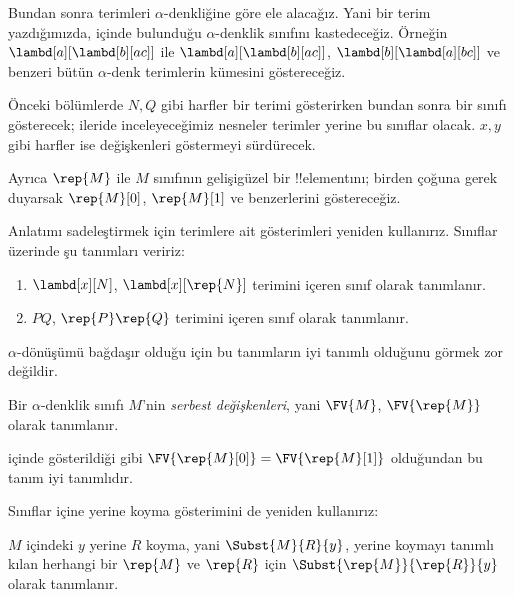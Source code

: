 


Bundan sonra terimleri $\alpha$-denkliğine göre ele alacağız. Yani bir terim
yazdığımızda, içinde bulunduğu $\alpha$-denklik sınıfını kastedeceğiz.
Örneğin $\lambd[a][\lambd[b][a c]]$ ile
$\lambd[a][\lambd[b][a c]]$, $\lambd[b][\lambd[a][b c]]$ ve benzeri bütün
$\alpha$-denk terimlerin kümesini göstereceğiz.

Önceki bölümlerde $N,Q$ gibi harfler bir terimi gösterirken bundan sonra bir
sınıfı gösterecek; ileride inceleyeceğimiz nesneler terimler yerine bu
sınıflar olacak. $x,y$ gibi harfler ise değişkenleri göstermeyi sürdürecek.

Ayrıca $\rep{M}$ ile $M$ sınıfının gelişigüzel bir !!{element}{}ını;
birden çoğuna gerek duyarsak $\rep{M}[0]$, $\rep{M}[1]$ ve benzerlerini
göstereceğiz.

Anlatımı sadeleştirmek için terimlere ait gösterimleri yeniden kullanırız.
Sınıflar üzerinde şu tanımları veririz:
\begin{defn}
  \begin{enumerate}
  \item $\lambd[x][N]$, $\lambd[x][\rep{N}]$ terimini içeren sınıf olarak
    tanımlanır.
  \item $PQ$, $\rep{P}\rep{Q}$ terimini içeren sınıf olarak tanımlanır.
  \end{enumerate}
\end{defn}

$\alpha$-dönüşümü bağdaşır olduğu için bu tanımların iyi tanımlı olduğunu
görmek zor değildir.

\begin{defn} 
  Bir $\alpha$-denklik sınıfı $M$'nin \emph{serbest değişkenleri}, yani
  $\FV{M}$, $\FV{\rep{M}}$ olarak tanımlanır.
\end{defn}

 içinde gösterildiği gibi
$\FV{\rep{M}[0]}=\FV{\rep{M}[1]}$ olduğundan bu tanım iyi tanımlıdır.

Sınıflar içine yerine koyma gösterimini de yeniden kullanırız:
\begin{defn} 
  $M$ içindeki $y$ yerine $R$ koyma, yani $\Subst{M}{R}{y}$, yerine koymayı
  tanımlı kılan herhangi bir $\rep{M}$ ve $\rep{R}$ için
  $\Subst{\rep{M}}{\rep{R}}{y}$ olarak tanımlanır.
\end{defn}


